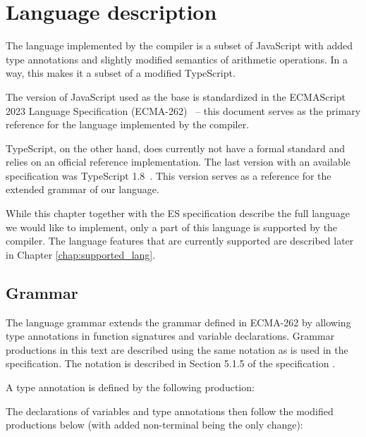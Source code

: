 \chapter{Language description}\label{language}

The language implemented by the compiler is a subset of JavaScript with added type annotations and slightly modified semantics of arithmetic operations. In a way, this makes it a subset of a modified TypeScript.

The version of JavaScript used as the base is standardized in the ECMAScript 2023 Language Specification (ECMA-262)~\cite{ecma262} -- this document serves as the primary reference for the language implemented by the compiler.

TypeScript, on the other hand, does currently not have a formal standard and relies on an official reference implementation. The last version with an available specification was TypeScript 1.8~\cite{typescript18}. This version serves as a reference for the extended grammar of our language.

While this chapter together with the ES specification describe the full language we would like to implement, only a part of this language is supported by the compiler. The language features that are currently supported are described later in Chapter \ref{chap:supported_lang}.


\section{Grammar}\label{lang:grammar}

The language grammar extends the grammar defined in ECMA-262 by allowing type annotations in function signatures and variable declarations. Grammar productions in this text are described using the same notation as is used in the specification. The notation is described in Section 5.1.5 of the specification \cite{ecma262}.

A type annotation is defined by the following production:

\GrammarRule[TypeAnnotation]{}{
    \terminal{:} \nonterminal[Identifier]{}{}
}


The declarations of variables and type annotations then follow the modified productions below (with added \nonterminal[TypeAnnotation]{}{} non-terminal being the only change):



